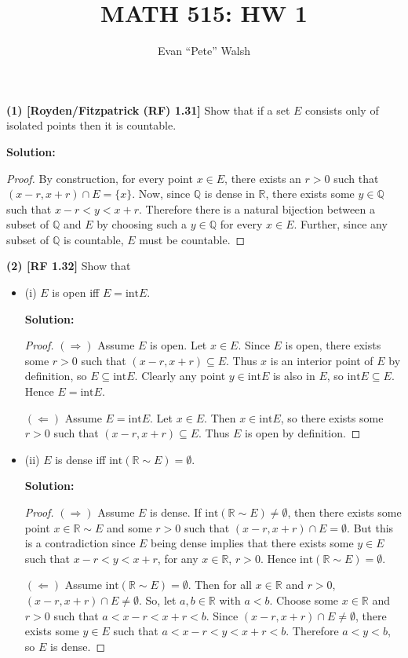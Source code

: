\documentclass[12pt]{article}
\title{MATH 515: HW 1}
\author{Evan ``Pete'' Walsh}
\begin{document}
\maketitle

{\bf (1) [Royden/Fitzpatrick (RF) 1.31]} Show that if a set $E$ consists only of
isolated points then it is countable.

{\bf Solution:}

\begin{proof}
  By construction, for every point $x \in E$, there exists an $r > 0$ such that
  $(x-r, x+r) \cap E = \{x\}$. Now, since $\mathbb{Q}$ is dense in $\mathbb{R}$,
  there exists some $y \in \mathbb{Q}$ such that $x-r < y < x+r$. Therefore
  there is a natural bijection between a subset of $\mathbb{Q}$ and $E$ by
  choosing such a $y \in \mathbb{Q}$ for every $x \in E$. Further, since any
  subset of $\mathbb{Q}$ is countable, $E$ must be countable.
\end{proof}

{\bf (2) [RF 1.32]} Show that 
\begin{itemize}[label={},leftmargin=4mm, itemsep=1em, parsep=1em]
  \item (i) $E$ is open iff $E = \text{int} E$.

  {\bf Solution:}
  \begin{proof}
    $(\Rightarrow)$ Assume $E$ is open. Let $x\in E$. Since $E$ is open, there
    exists some $r > 0$ such that $(x-r, x+r) \subseteq E$. Thus $x$ is an
    interior point of $E$ by definition, so $E \subseteq \text{int} E$. Clearly
    any point $y \in \text{int} E$ is also in $E$, so $\text{int} E \subseteq
    E$. Hence $E = \text{int}E$.

    $(\Leftarrow)$ Assume $E = \text{int}E$. Let $x \in E$. Then $x \in
    \text{int} E$, so there exists some $r > 0$ such that $(x-r, x+r) \subseteq
    E$. Thus $E$ is open by definition.
  \end{proof}

  \item (ii) $E$ is dense iff $\text{int} (\mathbb{R} \sim E) = \emptyset$.

  {\bf Solution:}
  \begin{proof}
    $(\Rightarrow)$ Assume $E$ is dense. If $\text{int}(\mathbb{R} \sim E) \neq
    \emptyset$, then there exists some point $x\in \mathbb{R} \sim E$ and some
    $r > 0$ such that $(x-r, x+r) \cap E = \emptyset$. But this is a
    contradiction since $E$ being dense implies that there exists some $y \in E$
    such that $x-r < y < x+r$, for any $x \in \mathbb{R}$, $r > 0$. Hence
    $\text{int}(\mathbb{R} \sim E) = \emptyset$.

    $(\Leftarrow)$ Assume $\text{int}(\mathbb{R}\sim E) = \emptyset$. Then for
    all $x \in \mathbb{R}$ and $r > 0$, $(x - r, x+r) \cap E \neq \emptyset$.
    So, let $a, b \in \mathbb{R}$ with $a < b$. Choose some $x \in \mathbb{R}$
    and $r > 0$ such that $a < x-r < x+r < b$. Since $(x-r, x+r)\cap E \neq
    \emptyset$, there exists some $y \in E$ such that $a < x-r < y < x+r < b$.
    Therefore $a < y < b$, so $E$ is dense.
  \end{proof}
\end{itemize}
\end{document}
